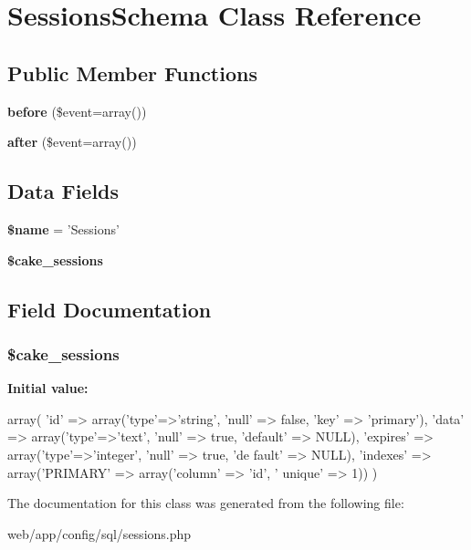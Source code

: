 \hypertarget{class_sessions_schema}{
\section{SessionsSchema Class Reference}
\label{class_sessions_schema}
}
\subsection*{Public Member Functions}
\begin{DoxyCompactItemize}
\item 
\hypertarget{class_sessions_schema_a3520fea3fe761944de85bdb84faff032}{
{\bfseries before} (\$event=array())}
\label{class_sessions_schema_a3520fea3fe761944de85bdb84faff032}

\item 
\hypertarget{class_sessions_schema_a39eb72bb9d764d16cdf7fc1e1a84c504}{
{\bfseries after} (\$event=array())}
\label{class_sessions_schema_a39eb72bb9d764d16cdf7fc1e1a84c504}

\end{DoxyCompactItemize}
\subsection*{Data Fields}
\begin{DoxyCompactItemize}
\item 
\hypertarget{class_sessions_schema_ab2fc40d43824ea3e1ce5d86dee0d763b}{
{\bfseries \$name} = 'Sessions'}
\label{class_sessions_schema_ab2fc40d43824ea3e1ce5d86dee0d763b}

\item 
{\bfseries \$cake\_\-sessions}
\end{DoxyCompactItemize}


\subsection{Field Documentation}
\hypertarget{class_sessions_schema_a7c791586259039b7b446eb3699497803}{
\subsubsection[{\$cake\_\-sessions}]{\setlength{\rightskip}{0pt plus 5cm}\$cake\_\-sessions}}
\label{class_sessions_schema_a7c791586259039b7b446eb3699497803}
{\bfseries Initial value:}
\begin{DoxyCode}
 array(
                        'id' => array('type'=>'string', 'null' => false, 'key' =>
       'primary'),
                        'data' => array('type'=>'text', 'null' => true, 'default'
       => NULL),
                        'expires' => array('type'=>'integer', 'null' => true, 'de
      fault' => NULL),
                        'indexes' => array('PRIMARY' => array('column' => 'id', '
      unique' => 1))
                )
\end{DoxyCode}


The documentation for this class was generated from the following file:\begin{DoxyCompactItemize}
\item 
web/app/config/sql/sessions.php\end{DoxyCompactItemize}
